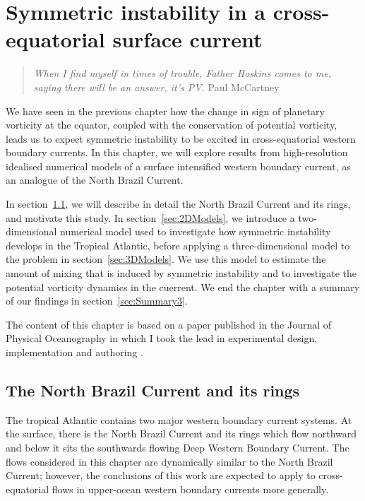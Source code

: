 \chapter{Symmetric instability in a cross-equatorial surface current}
\label{chap:3}
\begin{quote}
    \textit{When I find myself in times of trouble, Father Hoskins comes to me, saying there will be an answer, it's PV.}
    \newline Paul McCartney
\end{quote}

We have seen in the previous chapter how the change in sign of planetary vorticity at the equator, coupled with the conservation of potential vorticity, leads us to expect symmetric instability to be excited in cross-equatorial western boundary currents. In this chapter, we will explore results from high-resolution idealised numerical models of a surface intensified western boundary current, as an analogue of the North Brazil Current.

In section~\ref{sec:NBCandR}, we will describe in detail the North Brazil Current and its rings, and motivate this study. In section~\ref{sec:2DModels}, we introduce a two-dimensional numerical model used to investigate how symmetric instability develops in the Tropical Atlantic, before applying a three-dimensional model to the problem in section~\ref{sec:3DModels}. We use this model to estimate the amount of mixing that is induced by symmetric instability and to investigate the potential vorticity dynamics in the cuerrent. We end the chapter with a summary of our findings in section~\ref{sec:Summary3}.

The content of this chapter is based on a paper published in the Journal of Physical Oceanography in which I took the lead in experimental design, implementation and authoring \citep{Goldsworth2021}.

\section{The North Brazil Current and its rings}
\label{sec:NBCandR}
The tropical Atlantic contains two major western boundary current systems. At the surface, there is the North Brazil Current and its rings which flow northward and below it sits the southwards flowing Deep Western Boundary Current. The flows considered in this chapter are dynamically similar to the North Brazil Current; however, the conclusions of this work are expected to apply to cross-equatorial flows in upper-ocean western boundary currents more generally.

